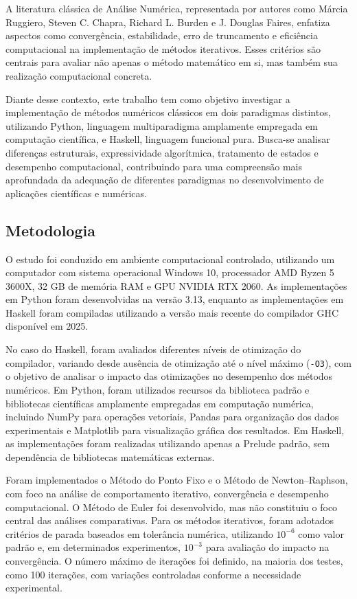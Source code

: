 A literatura clássica de Análise Numérica, representada por autores como
Márcia Ruggiero, Steven C. Chapra, Richard L. Burden e J. Douglas Faires,
enfatiza aspectos como convergência, estabilidade, erro de truncamento e
eficiência computacional na implementação de métodos iterativos. Esses
critérios são centrais para avaliar não apenas o método matemático em si, mas
também sua realização computacional concreta.

Diante desse contexto, este trabalho tem como objetivo investigar a
implementação de métodos numéricos clássicos em dois paradigmas distintos,
utilizando Python, linguagem multiparadigma amplamente empregada em computação
científica, e Haskell, linguagem funcional pura. Busca-se analisar diferenças
estruturais, expressividade algorítmica, tratamento de estados e desempenho
computacional, contribuindo para uma compreensão mais aprofundada da adequação
de diferentes paradigmas no desenvolvimento de aplicações científicas e
numéricas.

\subsection{Metodologia}

O estudo foi conduzido em ambiente computacional controlado, utilizando um
computador com sistema operacional Windows 10, processador AMD Ryzen 5 3600X,
32 GB de memória RAM e GPU NVIDIA RTX 2060. As implementações em Python foram
desenvolvidas na versão 3.13, enquanto as implementações em Haskell foram
compiladas utilizando a versão mais recente do compilador GHC disponível em
2025.

No caso do Haskell, foram avaliados diferentes níveis de otimização do
compilador, variando desde ausência de otimização até o nível máximo
(\texttt{-O3}), com o objetivo de analisar o impacto das otimizações no
desempenho dos métodos numéricos. Em Python, foram utilizados recursos da
biblioteca padrão e bibliotecas científicas amplamente empregadas em computação
numérica, incluindo NumPy para operações vetoriais, Pandas para organização dos
dados experimentais e Matplotlib para visualização gráfica dos resultados. Em
Haskell, as implementações foram realizadas utilizando apenas a Prelude padrão,
sem dependência de bibliotecas matemáticas externas.

Foram implementados o Método do Ponto Fixo e o Método de Newton--Raphson, com
foco na análise de comportamento iterativo, convergência e desempenho
computacional. O Método de Euler foi desenvolvido, mas não constituiu o foco
central das análises comparativas. Para os métodos iterativos, foram adotados
critérios de parada baseados em tolerância numérica, utilizando
$10^{-6}$ como valor padrão e, em determinados experimentos, $10^{-3}$ para
avaliação do impacto na convergência. O número máximo de iterações foi definido,
na maioria dos testes, como 100 iterações, com variações controladas conforme a
necessidade experimental.

